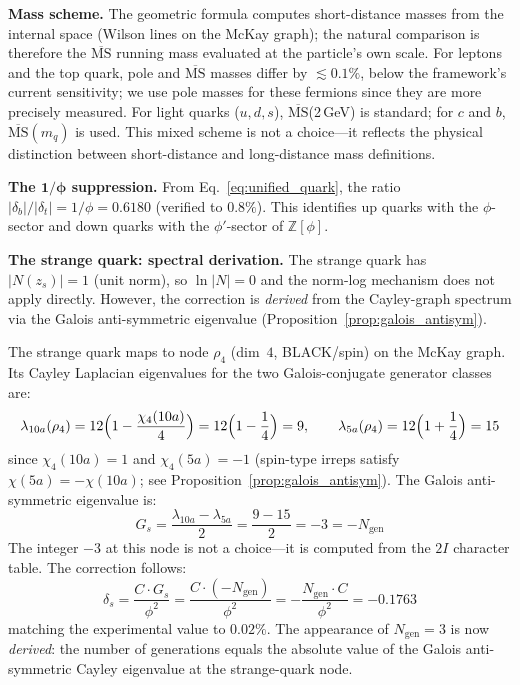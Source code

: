 \documentclass[12pt,a4paper]{article}
\theoremstyle{definition}
\begin{document}
\textbf{Mass scheme.}  The geometric formula computes short-distance masses from the internal space (Wilson lines on the McKay graph); the natural comparison is therefore the $\overline{\text{MS}}$ running mass evaluated at the particle's own scale.  For leptons and the top quark, pole and $\overline{\text{MS}}$ masses differ by $\lesssim 0.1\%$, below the framework's current sensitivity; we use pole masses for these fermions since they are more precisely measured.  For light quarks ($u, d, s$), $\overline{\text{MS}}$(2\,GeV) is standard; for $c$ and $b$, $\overline{\text{MS}}(m_q)$ is used.  This mixed scheme is not a choice---it reflects the physical distinction between short-distance and long-distance mass definitions.

\textbf{The $\mathbf{1/\phi}$ suppression.} From Eq.~\eqref{eq:unified_quark}, the ratio $|\delta_b|/|\delta_t| = 1/\phi = 0.6180$ (verified to $0.8\%$).  This identifies up quarks with the $\phi$-sector and down quarks with the $\phi'$-sector of $\mathbb{Z}[\phi]$.

\textbf{The strange quark: spectral derivation.} The strange quark has $|N(z_s)| = 1$ (unit norm), so $\ln|N| = 0$ and the norm-log mechanism does not apply directly.  However, the correction is \emph{derived} from the Cayley-graph spectrum via the Galois anti-symmetric eigenvalue (Proposition~\ref{prop:galois_antisym}).

The strange quark maps to node $\rho_4$ (dim~$4$, BLACK/spin) on the McKay graph.  Its Cayley Laplacian eigenvalues for the two Galois-conjugate generator classes are:
\begin{equation}
\lambda_{10a}(\rho_4) = 12\Bigl(1 - \frac{\chi_4(10a)}{4}\Bigr) = 12\Bigl(1 - \frac{1}{4}\Bigr) = 9, \qquad
\lambda_{5a}(\rho_4) = 12\Bigl(1 + \frac{1}{4}\Bigr) = 15
\end{equation}
since $\chi_4(10a) = 1$ and $\chi_4(5a) = -1$ (spin-type irreps satisfy $\chi(5a) = -\chi(10a)$; see Proposition~\ref{prop:galois_antisym}).  The Galois anti-symmetric eigenvalue is:
\begin{equation}
G_s = \frac{\lambda_{10a} - \lambda_{5a}}{2} = \frac{9 - 15}{2} = -3 = -N_{\text{gen}}
\end{equation}
The integer $-3$ at this node is not a choice---it is computed from the $2I$ character table.  The correction follows:
\begin{equation}
\boxed{\delta_s = \frac{C \cdot G_s}{\phi^2} = \frac{C \cdot (-N_{\text{gen}})}{\phi^2} = -\frac{N_{\text{gen}} \cdot C}{\phi^2} = -0.1763}
\label{eq:delta_s_spectral}
\end{equation}
matching the experimental value to $0.02\%$.  The appearance of $N_{\text{gen}} = 3$ is now \emph{derived}: the number of generations equals the absolute value of the Galois anti-symmetric Cayley eigenvalue at the strange-quark node.
\end{document}
